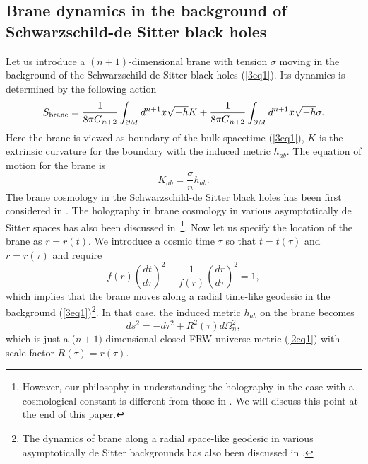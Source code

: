 \documentclass[a4paper,12pt]{article}
\begin{document}
\subsection{Brane dynamics in the background of Schwarzschild-de
Sitter black holes}

Let us introduce a $(n+1)$-dimensional brane with tension $\sigma $ moving
in the background of the Schwarzschild-de Sitter black holes
(\ref{3eq1}). Its dynamics is determined by the following
action~\cite{SV,Wall}
\begin{equation}
\label{3eq6} S_{\rm brane}=\frac{1}{8\pi G_{n+2}}\int_{\partial
M}d^{n+1}x \sqrt{-h}K +\frac{1}{8\pi G_{n+2}}\int_{\partial
M}d^{n+1}x\sqrt{-h} \sigma.
\end{equation}
Here the brane is viewed as boundary of the bulk spacetime
(\ref{3eq1}), $K$ is the extrinsic curvature for the boundary with
the induced metric $h_{ab}$. The equation of motion for the brane is
\begin{equation}
\label{3eq7}
 K_{ab}=\frac{\sigma}{n}h_{ab}.
\end{equation}
The brane cosmology in the Schwarzschild-de Sitter black holes has
been first considered in \cite{Ogush}. The holography in brane
cosmology in various asymptotically de Sitter spaces has  also
been discussed in~\cite{Ogush,deSitter}\footnote{However, our philosophy 
in understanding the holography in the case with a cosmological 
constant is different from those in \cite{Ogush,deSitter}. We will discuss this point
at the end of this paper.}.
 Now let us specify the location
of the brane as $r=r(t)$. We introduce a cosmic time $\tau$ so
that $t=t(\tau)$ and $r=r(\tau)$ and require
\begin{equation}
\label{3eq8}
 f(r)\left(\frac{dt}{d\tau}\right)^2
 -\frac{1}{f(r)}\left(\frac{dr}{d\tau}\right)^2 =1,
 \end{equation}
 which implies that the brane moves along a radial time-like geodesic
in the background (\ref{3eq1})\footnote{The dynamics of brane
along a radial space-like geodesic in various asymptotically de Sitter 
backgrounds has also been discussed in \cite{Ogush,deSitter}.}. In that case, the
induced metric $h_{ab}$ on the brane becomes
\begin{equation}
\label{3eq9} ds^2 =-d\tau^2 +R^2(\tau)d\Omega_n^2,
\end{equation}
which is just a ($n+1)$-dimensional closed FRW universe metric
(\ref{2eq1}) with  scale factor $R(\tau)=r(\tau)$.
\end{document}
